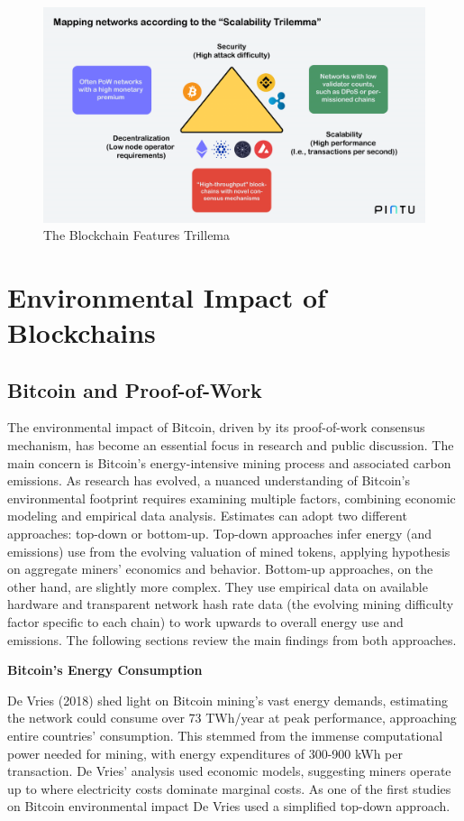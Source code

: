 \documentclass[11pt]{report}
\begin{document}
\begin{figure}[hbt!]
    \centering
    \centerline{\includegraphics[scale=0.23]{figures/blockchain_trilemma.png}}
    \caption[YO]{The Blockchain Features Trillema}
    \label{fig:blockchain_trilemma}
\end{figure}


\section{Environmental Impact of Blockchains}
\subsection{Bitcoin and Proof-of-Work}
The environmental impact of Bitcoin, driven by its proof-of-work consensus mechanism, has become an essential focus in research and public discussion. The main concern is Bitcoin's energy-intensive mining process and associated carbon emissions. As research has evolved, a nuanced understanding of Bitcoin's environmental footprint requires examining multiple factors, combining economic modeling and empirical data analysis. Estimates can adopt two different approaches: top-down or bottom-up. Top-down approaches infer energy (and emissions) use from the evolving valuation of mined tokens, applying hypothesis on aggregate miners' economics and behavior. Bottom-up approaches, on the other hand, are slightly more complex. They use empirical data on available hardware and transparent network hash rate data (the evolving mining difficulty factor specific to each chain) to work upwards to overall energy use and emissions. The following sections review the main findings from both approaches.

\textbf{Bitcoin's Energy Consumption}

De Vries (2018) \cite{devriesBitcoinGrowingEnergy2018} shed light on Bitcoin mining's vast energy demands, estimating the network could consume over 73 TWh/year at peak performance, approaching entire countries' consumption. This stemmed from the immense computational power needed for mining, with energy expenditures of 300-900 kWh per transaction. De Vries' analysis used economic models, suggesting miners operate up to where electricity costs dominate marginal costs. As one of the first studies on Bitcoin environmental impact De Vries used a simplified top-down approach.
\end{document}
